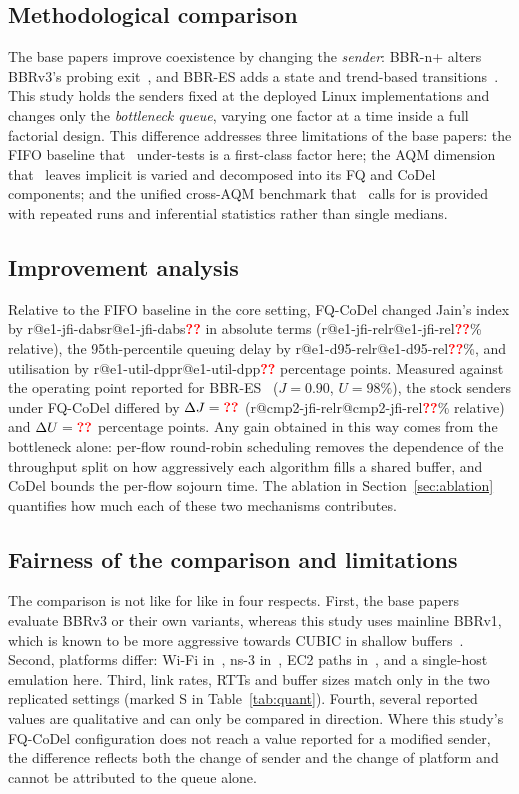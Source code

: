 \documentclass[conference]{IEEEtran}
\makeatletter
\newcommand{\R}[1]{\ifcsname r@#1\endcsname\csname r@#1\endcsname\else\textcolor{red}{\textbf{??}}\fi}
\makeatother
\begin{document}
\subsection{Methodological comparison}
The base papers improve coexistence by changing the \emph{sender}: BBR-n+ alters BBRv3's probing exit~\cite{ahsan2026bbrn}, and BBR-ES adds a state and trend-based transitions~\cite{han2026bbres}. This study holds the senders fixed at the deployed Linux implementations and changes only the \emph{bottleneck queue}, varying one factor at a time inside a full factorial design. This difference addresses three limitations of the base papers: the FIFO baseline that~\cite{ahsan2026bbrn} under-tests is a first-class factor here; the AQM dimension that~\cite{han2026bbres} leaves implicit is varied and decomposed into its FQ and CoDel components; and the unified cross-AQM benchmark that~\cite{abrol2026survey} calls for is provided with repeated runs and inferential statistics rather than single medians.

\subsection{Improvement analysis}
Relative to the FIFO baseline in the core setting, FQ-CoDel changed Jain's index by \R{e1-jfi-dabs} in absolute terms (\R{e1-jfi-rel}\% relative), the 95th-percentile queuing delay by \R{e1-d95-rel}\%, and utilisation by \R{e1-util-dpp} percentage points. Measured against the operating point reported for BBR-ES~\cite{han2026bbres} ($J=0.90$, $U=98\%$), the stock senders under FQ-CoDel differed by $\Delta J=\R{cmp2-jfi-abs}$ (\R{cmp2-jfi-rel}\% relative) and $\Delta U=\R{cmp2-util-abs}$ percentage points. Any gain obtained in this way comes from the bottleneck alone: per-flow round-robin scheduling removes the dependence of the throughput split on how aggressively each algorithm fills a shared buffer, and CoDel bounds the per-flow sojourn time. The ablation in Section~\ref{sec:ablation} quantifies how much each of these two mechanisms contributes.

\subsection{Fairness of the comparison and limitations}
The comparison is not like for like in four respects. First, the base papers evaluate BBRv3 or their own variants, whereas this study uses mainline BBRv1, which is known to be more aggressive towards CUBIC in shallow buffers~\cite{hock2017bbr,cao2019bbr}. Second, platforms differ: Wi-Fi in~\cite{shrestha2025wifi}, ns-3 in~\cite{kumari2025cubic}, EC2 paths in~\cite{han2026bbres}, and a single-host emulation here. Third, link rates, RTTs and buffer sizes match only in the two replicated settings (marked S in Table~\ref{tab:quant}). Fourth, several reported values are qualitative and can only be compared in direction. Where this study's FQ-CoDel configuration does not reach a value reported for a modified sender, the difference reflects both the change of sender and the change of platform and cannot be attributed to the queue alone.
\end{document}
